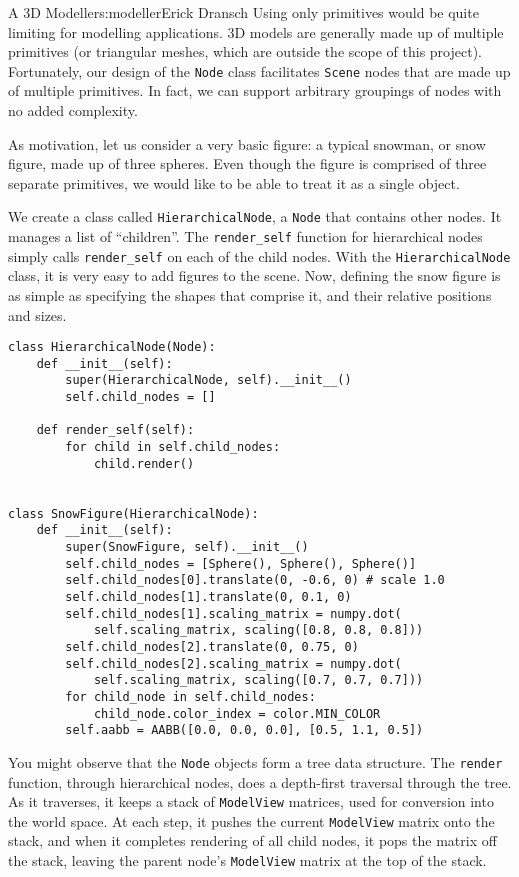 \begin{aosachapter}{A 3D Modeller}{s:modeller}{Erick Dransch}
Using only primitives would be quite limiting for modelling
applications. 3D models are generally made up of multiple primitives (or
triangular meshes, which are outside the scope of this project).
Fortunately, our design of the \texttt{Node} class facilitates
\texttt{Scene} nodes that are made up of multiple primitives. In fact,
we can support arbitrary groupings of nodes with no added complexity.

As motivation, let us consider a very basic figure: a typical snowman,
or snow figure, made up of three spheres. Even though the figure is
comprised of three separate primitives, we would like to be able to
treat it as a single object.

We create a class called \texttt{HierarchicalNode}, a \texttt{Node} that
contains other nodes. It manages a list of ``children''. The
\texttt{render\_self} function for hierarchical nodes simply calls
\texttt{render\_self} on each of the child nodes. With the
\texttt{HierarchicalNode} class, it is very easy to add figures to the
scene. Now, defining the snow figure is as simple as specifying the
shapes that comprise it, and their relative positions and sizes.


\begin{verbatim}
class HierarchicalNode(Node):
    def __init__(self):
        super(HierarchicalNode, self).__init__()
        self.child_nodes = []

    def render_self(self):
        for child in self.child_nodes:
            child.render()


class SnowFigure(HierarchicalNode):
    def __init__(self):
        super(SnowFigure, self).__init__()
        self.child_nodes = [Sphere(), Sphere(), Sphere()]
        self.child_nodes[0].translate(0, -0.6, 0) # scale 1.0
        self.child_nodes[1].translate(0, 0.1, 0)
        self.child_nodes[1].scaling_matrix = numpy.dot(
            self.scaling_matrix, scaling([0.8, 0.8, 0.8]))
        self.child_nodes[2].translate(0, 0.75, 0)
        self.child_nodes[2].scaling_matrix = numpy.dot(
            self.scaling_matrix, scaling([0.7, 0.7, 0.7]))
        for child_node in self.child_nodes:
            child_node.color_index = color.MIN_COLOR
        self.aabb = AABB([0.0, 0.0, 0.0], [0.5, 1.1, 0.5])
\end{verbatim}

You might observe that the \texttt{Node} objects form a tree data
structure. The \texttt{render} function, through hierarchical nodes,
does a depth-first traversal through the tree. As it traverses, it keeps
a stack of \texttt{ModelView} matrices, used for conversion into the
world space. At each step, it pushes the current \texttt{ModelView}
matrix onto the stack, and when it completes rendering of all child
nodes, it pops the matrix off the stack, leaving the parent node's
\texttt{ModelView} matrix at the top of the stack.


\end{aosachapter}

